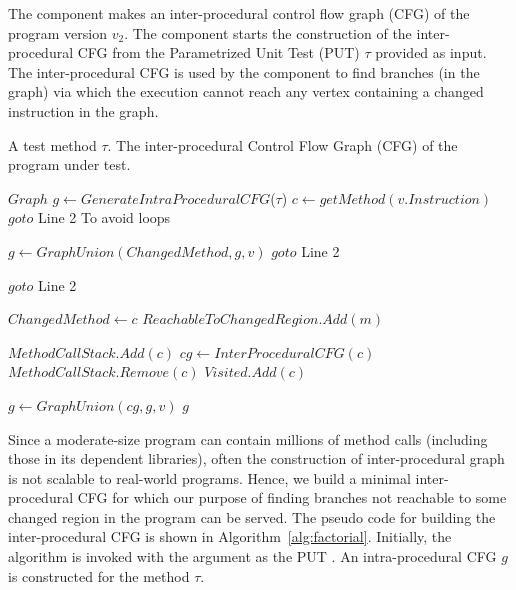 The  component makes an inter-procedural control flow graph (CFG) of the program version $v_2$. The  component starts the construction of the inter-procedural CFG from the Parametrized Unit Test (PUT) $\tau$ provided as input. The inter-procedural CFG is used by the  component to find branches (in the graph) via which the execution cannot reach any vertex containing a changed instruction in the graph.
\newcommand{\factorial}{\ensuremath{\mbox{\sc Factorial}}}
\begin{algorithm}[h!]
\begin{tiny}
\caption{$InterProceduralCFG(\tau)$}\label{alg:factorial}
\begin{algorithmic}[1]
\REQUIRE A test method $\tau$.
\ENSURE The inter-procedural Control Flow Graph (CFG) of the program under test.

\medskip

\STATE $Graph$ $g \leftarrow GenerateIntraProceduralCFG$($\tau$)
 \STATE $c \leftarrow getMethod(v.Instruction)$
 \STATE $goto$ Line 2 To avoid loops
 \ENDIF
 
 
  \STATE $g \leftarrow GraphUnion(ChangedMethod, g, v)$ 
  \STATE $goto$ Line 2
 \ENDIF 
 
  \STATE $goto$ Line 2
 \ENDIF 
 
	 \STATE $ChangedMethod \leftarrow c $
		 \STATE $ReachableToChangedRegion.Add(m)$	
 	 \ENDFOR
 \ENDIF
 
 
 		
 \STATE $MethodCallStack.Add(c)$
 \STATE $cg \leftarrow InterProceduralCFG(c)$ 
 \STATE $MethodCallStack.Remove(c)$
 \STATE $Visited.Add(c)$
 
 \STATE $g \leftarrow GraphUnion(cg, g, v)$
 \ENDIF
\ENDFOR
\RETURN $g$
\label{alg:ICFG}
\end{algorithmic}
\end{tiny}
\end{algorithm}
Since a moderate-size program can contain millions of method calls (including those in its dependent libraries), often the construction of inter-procedural graph is not scalable to real-world programs. Hence, we build a minimal inter-procedural CFG for which our purpose of finding branches not reachable to some changed region in the program can be served. The pseudo code for building the inter-procedural CFG is shown in Algorithm~\ref{alg:factorial}. Initially, the algorithm  is invoked with the argument as the PUT \CodeIn{$\tau$}. An intra-procedural CFG $g$ is constructed for the method $\tau$. 

